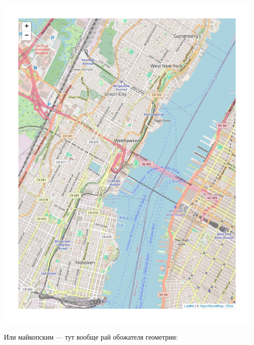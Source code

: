\documentclass[
  letterpaper,
  DIV=11,
  numbers=noendperiod]{scrreprt}
\theoremstyle{definition}
\theoremstyle{remark}
\begin{document}
\includegraphics{andan-cluster_files/figure-pdf/manhattan-1.pdf}

Или майкопским --- тут вообще рай обожателя геометрии:
\end{document}
